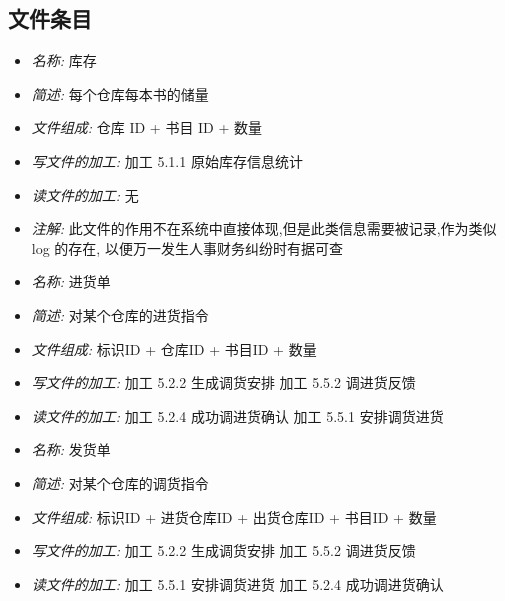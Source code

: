 \documentclass{article}
\begin{document}
\begin{CJK*}{UTF8}{gbsn}
\begin{itemize}
\end{itemize}


\vspace{-1mm}

\subsection{文件条目}
\begin{itemize}
\item \textit{名称: }库存
\item \textit{简述: }每个仓库每本书的储量
\item \textit{文件组成: }仓库 ID + 书目 ID + 数量
\item \textit{写文件的加工: }加工 5.1.1 原始库存信息统计
\item \textit{读文件的加工: }无 
\item \textit{注解: }此文件的作用不在系统中直接体现,但是此类信息需要被记录,作为类似 log 的存在, 以便万一发生人事财务纠纷时有据可查

\end{itemize}


\vspace{-1mm}


\begin{itemize}
\item \textit{名称: }进货单
\item \textit{简述: } 对某个仓库的进货指令
\item \textit{文件组成: } 标识ID + 仓库ID + 书目ID + 数量 
\item \textit{写文件的加工: }加工 5.2.2 生成调货安排 加工 5.5.2 调进货反馈 
\item \textit{读文件的加工: }加工 5.2.4 成功调进货确认 加工 5.5.1 安排调货进货

\end{itemize}


\vspace{-1mm}


\begin{itemize}
\item \textit{名称: }发货单
\item \textit{简述: } 对某个仓库的调货指令
\item \textit{文件组成: }标识ID + 进货仓库ID + 出货仓库ID + 书目ID + 数量 
\item \textit{写文件的加工: }加工 5.2.2 生成调货安排 加工 5.5.2 调进货反馈 
\item \textit{读文件的加工: }加工 5.5.1 安排调货进货 加工 5.2.4 成功调进货确认


\end{itemize}
\end{CJK*}
\end{document}
